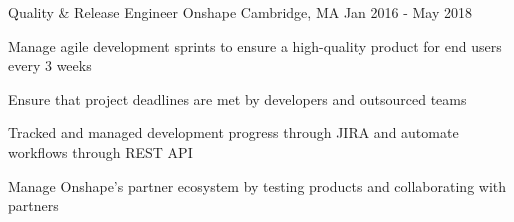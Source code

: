 

\begin{cventries}

  \cventry
    {Quality \& Release Engineer} %
    {Onshape} %
    {Cambridge, MA} %
    {Jan 2016 - May 2018} %
    {
      \begin{cvitems} %
        \item {Manage agile development sprints to ensure a high-quality product for end users every 3 weeks}
        \item {Ensure that project deadlines are met by developers and outsourced teams}
        \item {Tracked and managed development progress through JIRA and automate workflows through REST API}
        \item {Manage Onshape’s partner ecosystem by testing products and collaborating with partners}
      \end{cvitems}
    }


\end{cventries}

